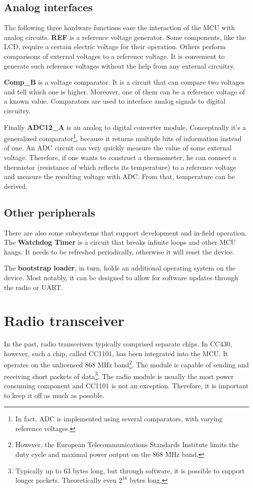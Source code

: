 \subsection{Analog interfaces}

The following three hardware functions ease the interaction
of the MCU with analog circuits.  {\bf REF} is a reference voltage
generator. Some components, like the LCD, require a certain electric
voltage for their operation.  Others perform comparisons of external
voltages to a reference voltage. It is convenient to generate such
reference voltages without the help from any external circuitry.

{\bf Comp\_B} is a voltage comparator. It is a circuit that can
compare two voltages and tell which one is higher. Moreover, one of
them can be a reference voltage of a known value. Comparators are used
to interface analog signals to digital circuitry.

Finally {\bf ADC12\_A} is an analog to digital converter
module. Conceptually it's a generalized comparator\footnote{In
fact, ADC is implemented using several comparators, with varying
reference voltages.}, because it returns multiple bits of information
instead of one.  An ADC circuit can very quickly measure the value of
some external voltage. Therefore, if one wants to construct a thermometer,
he can connect a thermistor (resistance of which reflects its
temperature) to a reference voltage and measure the resulting
voltage with ADC. From that, temperature can be derived.

\subsection{Other peripherals}

There are also some subsystems that support development and in-field
operation. The {\bf Watchdog Timer} is a circuit that breaks infinite
loops and other MCU hangs. It needs to be refreshed periodically,
otherwise it will reset the device.

The {\bf bootstrap loader}, in turn, holds an additional operating
system on the device.  Most notably, it can be designed to allow for
software updates through the radio or UART.

\section{Radio transceiver}

In the past, radio transceivers typically comprised separate chips. In
CC430, however, such a chip, called CC1101, has been integrated into
the MCU.  It operates on the unlicensed 868 MHz band\footnote{However, the
European Telecommunications Standards Institute limits the duty cycle and
maximal power output on the 868 MHz band.}.  The module is capable of sending
and receiving short packets of data\footnote{Typically up to 63 bytes long, but
through software, it is possible to support longer packets. Theoretically even
$2^{16}$ bytes long.}.  The radio module is usually the most power consuming
component and CC1101 is not an exception. Therefore, it is important to keep it
off as much as possible.


